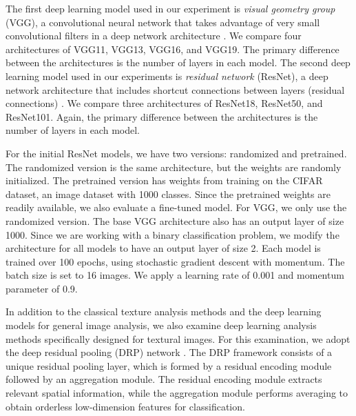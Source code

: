 \documentclass{aci}
\numberwithin{equation}{section}
\begin{document}

The first deep learning model used in our experiment is \textit{visual geometry
    group} (VGG), a convolutional neural network that takes advantage of very
small convolutional filters in a deep network architecture
\cite{simonyan_very_2015}. We compare four architectures of VGG11, VGG13,
VGG16, and VGG19. The primary difference between the architectures is the
number of layers in each model. The second deep learning model used in our
experiments is \textit{residual network} (ResNet), a deep network
architecture that includes shortcut connections between layers (residual
connections) \cite{he_deep_2015}. We compare three architectures of
ResNet18, ResNet50, and ResNet101. Again, the primary difference between the
architectures is the number of layers in each model.

For the initial ResNet models, we have two versions: randomized and pretrained.
The randomized version is the same architecture, but the weights are randomly
initialized. The pretrained version has weights from training on the CIFAR
dataset, an image dataset with 1000 classes. Since the pretrained weights are
readily available, we also evaluate a fine-tuned model. For VGG, we only use the
randomized version. The base VGG architecture also has an output layer of size
1000. Since we are working with a binary classification problem, we modify the
architecture for all models to have an output layer of size 2. Each model is
trained over 100 epochs, using stochastic gradient descent with momentum. The
batch size is set to 16 images. We apply a learning rate of 0.001 and momentum
parameter of 0.9.


In addition to the classical texture analysis methods and the deep learning
models for general image analysis, we also examine deep learning analysis
methods specifically designed for textural images. For this examination, we
adopt the deep residual pooling (DRP) network \cite{mao_deep_2021}. The DRP
framework consists of a unique residual pooling layer, which is formed by a
residual encoding module followed by an aggregation module. The residual
encoding module extracts relevant spatial information, while the aggregation
module performs averaging to obtain orderless low-dimension features for
classification.
\end{document}
